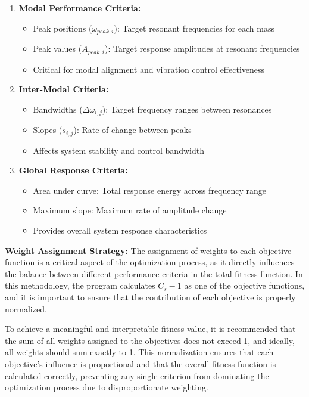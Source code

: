 \documentclass[12pt,a4paper]{article}
\begin{document}
\begin{enumerate}
    \item \textbf{Modal Performance Criteria:}
    \begin{itemize}
        \item Peak positions ($\omega_{peak,i}$): Target resonant frequencies for each mass
        \item Peak values ($A_{peak,i}$): Target response amplitudes at resonant frequencies
        \item Critical for modal alignment and vibration control effectiveness
    \end{itemize}
    

    \item \textbf{Inter-Modal Criteria:}
    \begin{itemize}
        \item Bandwidths ($\Delta\omega_{i,j}$): Target frequency ranges between resonances
        \item Slopes ($s_{i,j}$): Rate of change between peaks
        \item Affects system stability and control bandwidth
    \end{itemize}

    \item \textbf{Global Response Criteria:}
    \begin{itemize}
        \item Area under curve: Total response energy across frequency range
        \item Maximum slope: Maximum rate of amplitude change
        \item Provides overall system response characteristics
    \end{itemize}
\end{enumerate}

\textbf{Weight Assignment Strategy:} The assignment of weights to each objective function is a critical aspect of the optimization process, as it directly influences the balance between different performance criteria in the total fitness function. In this methodology, the program calculates $C_s - 1$ as one of the objective functions, and it is important to ensure that the contribution of each objective is properly normalized.

To achieve a meaningful and interpretable fitness value, it is recommended that the sum of all weights assigned to the objectives does not exceed 1, and ideally, all weights should sum exactly to 1. This normalization ensures that each objective's influence is proportional and that the overall fitness function is calculated correctly, preventing any single criterion from dominating the optimization process due to disproportionate weighting.
\end{document}
